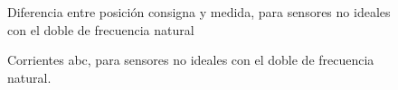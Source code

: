 \documentclass[a4paper, 10pt, onecolumn,journal]{ieeeconf}
\begin{document}
\begin{figure}[H]
	\centering
	\begin{adjustbox}{scale=0.5,max width=\columnwidth}
	\end{adjustbox}
	\caption{Diferencia entre posición consigna y medida, para sensores no ideales con el doble de frecuencia natural}
	\label{Diferencia entre posición consigna y medida, para sensores no ideales con el doble de frecuencia natural}
\end{figure}

\begin{figure}[H]
	\centering
	\begin{adjustbox}{scale=0.6,max width=\columnwidth}
	\end{adjustbox}
	\caption{Corrientes abc, para sensores no ideales con el doble de frecuencia natural.}
	\label{Corrientes abc, para sensores no ideales con el doble de frecuencia natural}
\end{figure}
\end{document}
